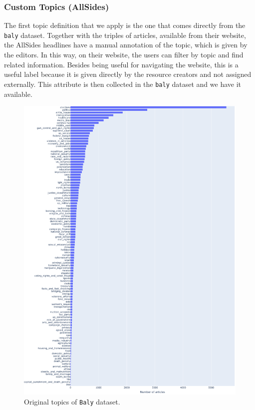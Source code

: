 
\subsubsection{\statusgreen Custom Topics (AllSides)}

The first topic definition that we apply is the one that comes directly from the \texttt{baly} dataset. Together with the triples of articles, available from their website, the AllSides headlines have a manual annotation of the topic, which is given by the editors. In this way, on their website, the users can filter by topic and find related information.
Besides being useful for navigating the website, this is a useful label because it is given directly by the resource creators and not assigned externally.
This attribute is then collected in the \texttt{baly} dataset and we have it available.

\begin{figure}[!htbp]
    \centering
    \includegraphics[width=\linewidth]{figures/baly_original_topics.pdf}
    \caption{Original topics of \texttt{Baly} dataset.}
    \label{fig:baly_original_topics}
\end{figure}

